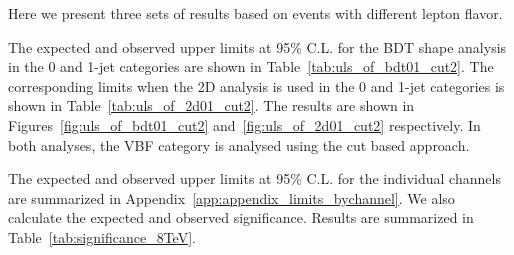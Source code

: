 Here we present three sets of results based on events with
different lepton flavor. 

The expected and observed upper limits at 95\% C.L.
for the BDT shape analysis in the 0 and 1-jet categories
are shown in Table~\ref{tab:uls_of_bdt01_cut2}.
The corresponding limits when the 2D analysis is used 
in the 0 and 1-jet categories is shown in Table~\ref{tab:uls_of_2d01_cut2}.
The results are shown in Figures~\ref{fig:uls_of_bdt01_cut2} 
and~\ref{fig:uls_of_2d01_cut2} respectively.
In both analyses, the VBF category is analysed using the cut based approach.

The expected and observed upper limits at 95\% C.L. for the individual channels 
are summarized in Appendix~\ref{app:appendix_limits_bychannel}. 
We also calculate the expected and observed significance.
Results are summarized in Table~\ref{tab:significance_8TeV}.

